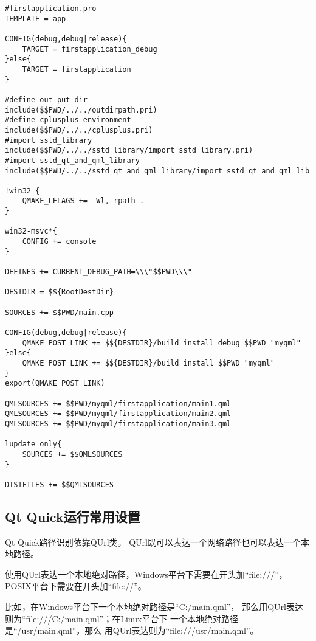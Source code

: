\FloatBarrier
\begin{lstlisting}[label=f000019,
caption=GoodLuck,
title=\lstlistingname\ \thelstlisting
]
#firstapplication.pro
TEMPLATE = app

CONFIG(debug,debug|release){
    TARGET = firstapplication_debug
}else{
    TARGET = firstapplication
}

#define out put dir
include($$PWD/../../outdirpath.pri)
#define cplusplus environment
include($$PWD/../../cplusplus.pri)
#import sstd_library
include($$PWD/../../sstd_library/import_sstd_library.pri)
#import sstd_qt_and_qml_library
include($$PWD/../../sstd_qt_and_qml_library/import_sstd_qt_and_qml_library.pri)

!win32 {
    QMAKE_LFLAGS += -Wl,-rpath .
}

win32-msvc*{
    CONFIG += console
}

DEFINES += CURRENT_DEBUG_PATH=\\\"$$PWD\\\"

DESTDIR = $${RootDestDir}

SOURCES += $$PWD/main.cpp

CONFIG(debug,debug|release){
    QMAKE_POST_LINK += $${DESTDIR}/build_install_debug $$PWD "myqml"
}else{
    QMAKE_POST_LINK += $${DESTDIR}/build_install $$PWD "myqml"
}
export(QMAKE_POST_LINK)

QMLSOURCES += $$PWD/myqml/firstapplication/main1.qml
QMLSOURCES += $$PWD/myqml/firstapplication/main2.qml
QMLSOURCES += $$PWD/myqml/firstapplication/main3.qml

lupdate_only{
    SOURCES += $$QMLSOURCES
}

DISTFILES += $$QMLSOURCES
\end{lstlisting}          %


\FloatBarrier
\subsection{
Qt Quick运行常用设置
}\label{ss001v10}


Qt Quick路径识别依靠QUrl类。
QUrl既可以表达一个网络路径也可以表达一个本地路径。

使用QUrl表达一个本地绝对路径，Windows平台下需要在开头加“file:///”，
POSIX平台下需要在开头加“file://”。

比如，在Windows平台下一个本地绝对路径是“C:/main.qml”，
那么用QUrl表达则为“file:///C:/main.qml”；在Linux平台下
一个本地绝对路径是“/usr/main.qml”，那么
用QUrl表达则为“file:///usr/main.qml”。

